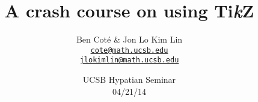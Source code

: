 %
%

\title{
  \bf A crash course on using Ti{\it k}Z
}

%
%
\author{
  Ben Cot\'e \& Jon Lo Kim Lin \\
  \href{mailto:cote@math.ucsb.edu}{\tt cote@math.ucsb.edu}\\
  \href{mailto:jlokimlin@math.ucsb.edu}{\tt jlokimlin@math.ucsb.edu}
}

%
%
\date{
  UCSB Hypatian Seminar\\
  04/21/14
}

\begin{frame}
  \maketitle
\end{frame}
